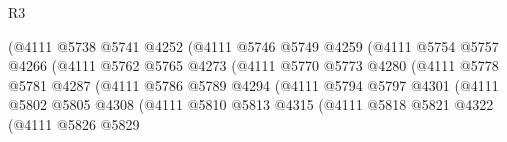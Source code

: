 \begin{lexlean}{R3}
\begin{coremodule}
                                      (@4111
                                        @5738
                                        @5741
                                        @4252
                                        (@4111
                                          @5746
                                          @5749
                                          @4259
                                          (@4111
                                            @5754
                                            @5757
                                            @4266
                                            (@4111
                                              @5762
                                              @5765
                                              @4273
                                              (@4111
                                                @5770
                                                @5773
                                                @4280
                                                (@4111
                                                  @5778
                                                  @5781
                                                  @4287
                                                  (@4111
                                                    @5786
                                                    @5789
                                                    @4294
                                                    (@4111
                                                      @5794
                                                      @5797
                                                      @4301
                                                      (@4111
                                                        @5802
                                                        @5805
                                                        @4308
                                                        (@4111
                                                          @5810
                                                          @5813
                                                          @4315
                                                          (@4111
                                                            @5818
                                                            @5821
                                                            @4322
                                                            (@4111
                                                              @5826
                                                              @5829

\end{coremodule}
\end{lexlean}
